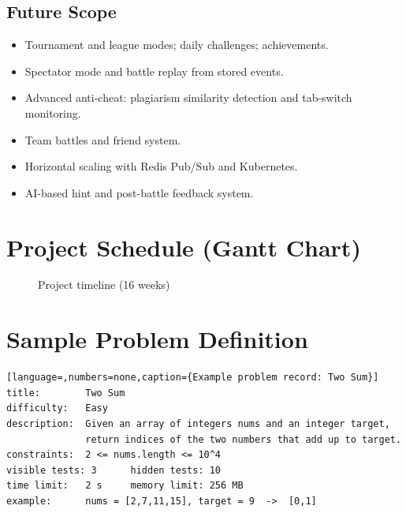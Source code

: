 \documentclass[12pt,a4paper,oneside]{report}
\begin{document}
\section{Future Scope}
\begin{itemize}[leftmargin=*]
  \item Tournament and league modes; daily challenges; achievements.
  \item Spectator mode and battle replay from stored events.
  \item Advanced anti-cheat: plagiarism similarity detection and tab-switch monitoring.
  \item Team battles and friend system.
  \item Horizontal scaling with Redis Pub/Sub and Kubernetes.
  \item AI-based hint and post-battle feedback system.
\end{itemize}

\appendix
\chapter{Project Schedule (Gantt Chart)}
\begin{figure}[H]
\centering
{}
\caption{Project timeline (16 weeks)}
\end{figure}

\chapter{Sample Problem Definition}
\begin{lstlisting}[language=,numbers=none,caption={Example problem record: Two Sum}]
title:        Two Sum
difficulty:   Easy
description:  Given an array of integers nums and an integer target,
              return indices of the two numbers that add up to target.
constraints:  2 <= nums.length <= 10^4
visible tests: 3      hidden tests: 10
time limit:   2 s     memory limit: 256 MB
example:      nums = [2,7,11,15], target = 9  ->  [0,1]
\end{lstlisting}
\end{document}
